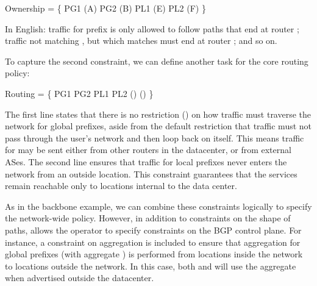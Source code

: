
\begin{code}
\Define Ownership = \{
    PG1 \Path \End(A)
    PG2 \Path \End(B)
    PL1 \Path \End(E)
    PL2 \Path \End(F)
\}
\end{code}
\noindent
In English: traffic for prefix  is only allowed to follow paths that
end at router ; traffic not matching , 
but which matches  must
end at router ; and so on.

To capture the second constraint, we can define another task for the core
routing policy:

\begin{code}
\Define Routing = \{
    PG1 \OR PG2 \Path \Any 
    PL1 \OR PL2 \Path \NOT{}\Enter(\Out)
    \True      \Path \Exit(\Out)
\}
\end{code}

The first line states that there is no restriction (\Any)
on how traffic must
traverse the network for global prefixes, aside from the default restriction
that traffic must not pass through the user's network and then loop
back on itself. This means traffic for
 may be sent either from other routers in the datacenter, or
from external ASes. The second line ensures that traffic for local
prefixes never enters the network from an outside location. This constraint
guarantees that the services remain reachable only to locations
internal to the data center.

As in the backbone example, we can combine these constraints
logically to specify the network-wide policy.
However, in addition to constraints on the shape of paths,
\sysname allows the operator to specify constraints on the BGP control plane.
For instance, a constraint on aggregation is included to ensure that
aggregation for global prefixes (with aggregate ) is performed from 
locations inside the network to locations outside the network. In this case, both  and  will use the aggregate  when advertised outside the datacenter.

